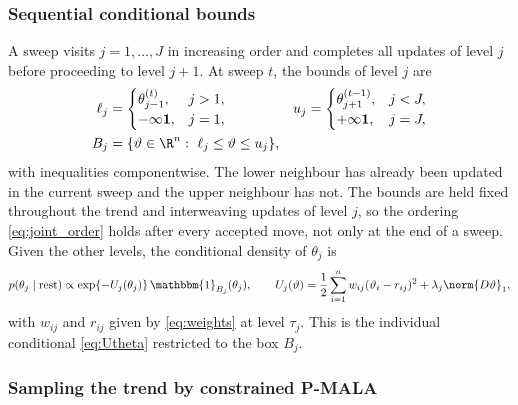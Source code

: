 \subsubsection{Sequential conditional bounds}

A sweep visits $j=1,\ldots,J$ in increasing order and completes all updates of level $j$ before proceeding to level $j+1$. At sweep $t$, the bounds of level $j$ are
\begin{equation}
\begin{aligned}
    \ell_j &= \begin{cases}\theta_{j-1}^{(t)}, & j>1,\\ -\infty\mathbf 1, & j=1,\end{cases}
    & u_j &= \begin{cases}\theta_{j+1}^{(t-1)}, & j<J,\\ +\infty\mathbf 1, & j=J,\end{cases} \\
    B_j &= \{\vartheta\in\R^n:\ \ell_j\leq\vartheta\leq u_j\},
\end{aligned}
    \label{eq:joint_box}
\end{equation}
with inequalities componentwise. The lower neighbour has already been updated in the current sweep and the upper neighbour has not. The bounds are held fixed throughout the trend and interweaving updates of level $j$, so the ordering \eqref{eq:joint_order} holds after every accepted move, not only at the end of a sweep. Given the other levels, the conditional density of $\theta_j$ is
\begin{equation}
    p(\theta_j \mid \text{rest}) \propto \exp\{-U_j(\theta_j)\}\,\mathbbm{1}_{B_j}(\theta_j), \qquad
    U_j(\vartheta) = \frac12\sum_{i=1}^n w_{ij}(\vartheta_i-r_{ij})^2 + \lambda_j\norm{D\vartheta}_1,
    \label{eq:joint_conditional}
\end{equation}
with $w_{ij}$ and $r_{ij}$ given by \eqref{eq:weights} at level $\tau_j$. This is the individual conditional \eqref{eq:Utheta} restricted to the box $B_j$.

\subsubsection{Sampling the trend by constrained P-MALA}

